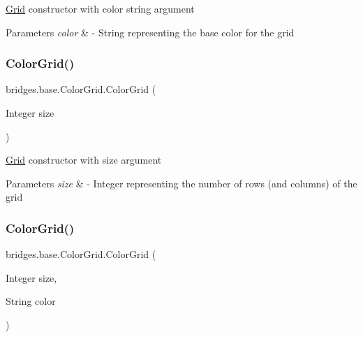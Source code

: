\mbox{\hyperlink{classbridges_1_1base_1_1_grid}{Grid}} constructor with color string argument


\begin{DoxyParams}{Parameters}
{\em color} & -\/ String representing the base color for the grid \\
\hline
\end{DoxyParams}
\mbox{\label{classbridges_1_1base_1_1_color_grid_a1c000a64a7f37ae4e0314d01e0da3f67}} 
\subsubsection{\texorpdfstring{Color\+Grid()}{ColorGrid()}\hspace{0.1cm}{\footnotesize\ttfamily [3/5]}}
{\footnotesize\ttfamily bridges.\+base.\+Color\+Grid.\+Color\+Grid (\begin{DoxyParamCaption}\item[{Integer}]{size }\end{DoxyParamCaption})}

\mbox{\hyperlink{classbridges_1_1base_1_1_grid}{Grid}} constructor with size argument


\begin{DoxyParams}{Parameters}
{\em size} & -\/ Integer representing the number of rows (and columns) of the grid \\
\hline
\end{DoxyParams}
\mbox{\label{classbridges_1_1base_1_1_color_grid_a3ed0ac3fbf782e1af16e132bfb6fad71}} 
\subsubsection{\texorpdfstring{Color\+Grid()}{ColorGrid()}\hspace{0.1cm}{\footnotesize\ttfamily [4/5]}}
{\footnotesize\ttfamily bridges.\+base.\+Color\+Grid.\+Color\+Grid (\begin{DoxyParamCaption}\item[{Integer}]{size,  }\item[{String}]{color }\end{DoxyParamCaption})}

